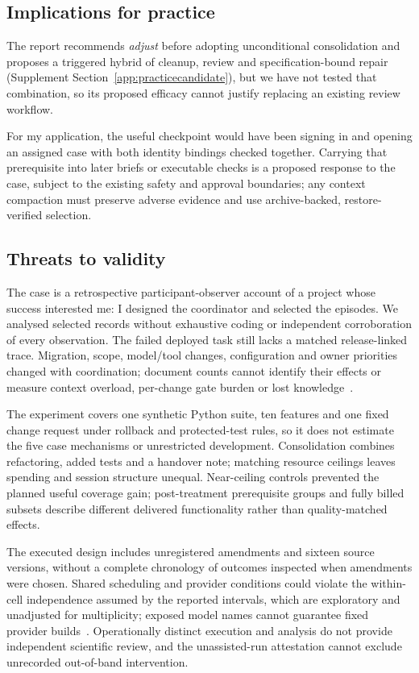 \documentclass[11pt,a4paper]{article}
\begin{document}
\subsection{Implications for practice}\label{sec:feedbackfirst}

The report recommends \emph{adjust} before adopting unconditional consolidation and proposes a triggered hybrid of cleanup, review and specification-bound repair (Supplement Section~\ref{app:practicecandidate}), but we have not tested that combination,
so its proposed efficacy cannot justify replacing an existing review
workflow.

For my application, the useful checkpoint would have been signing in and
opening an assigned case with both identity bindings checked together.
Carrying that prerequisite into later briefs or executable checks is a
proposed response to the case, subject to the existing safety and approval
boundaries; any context compaction must preserve adverse evidence and use
archive-backed, restore-verified selection.

\subsection{Threats to validity}\label{sec:threats}

The case is a retrospective participant-observer account of a project whose
success interested me: I designed the coordinator and selected the episodes.
We analysed selected records without exhaustive coding or independent
corroboration of every observation. The failed deployed task still lacks a
matched release-linked trace. Migration, scope, model/tool changes,
configuration and owner priorities changed with coordination; document
counts cannot identify their effects or measure context overload,
per-change gate burden or lost knowledge~\cite{devanbu2016belief}.

The experiment covers one synthetic Python suite, ten features and one
fixed change request under rollback and protected-test rules, so it
does not estimate the five case mechanisms or unrestricted development.
Consolidation combines refactoring, added tests and a handover note;
matching resource ceilings leaves spending and session structure
unequal. Near-ceiling controls prevented the planned useful coverage gain;
post-treatment prerequisite groups and fully billed subsets describe
different delivered functionality rather than quality-matched effects.

The executed design includes unregistered amendments and sixteen source
versions, without a complete chronology of outcomes inspected when
amendments were chosen. Shared scheduling and provider conditions could
violate the within-cell independence assumed by the reported intervals,
which are exploratory and unadjusted for multiplicity; exposed model names
cannot guarantee fixed provider builds~\cite{chen2023drift}. Operationally
distinct execution and analysis do not provide independent scientific
review, and the unassisted-run attestation cannot exclude unrecorded
out-of-band intervention.
\end{document}
